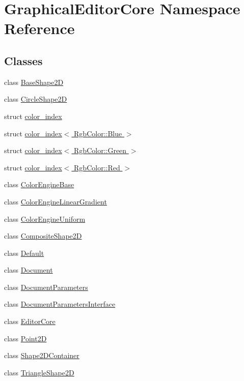 \hypertarget{namespaceGraphicalEditorCore}{}\section{Graphical\+Editor\+Core Namespace Reference}
\label{namespaceGraphicalEditorCore}
\subsection*{Classes}
\begin{DoxyCompactItemize}
\item 
class \hyperlink{classGraphicalEditorCore_1_1BaseShape2D}{Base\+Shape2D}
\item 
class \hyperlink{classGraphicalEditorCore_1_1CircleShape2D}{Circle\+Shape2D}
\item 
struct \hyperlink{structGraphicalEditorCore_1_1color__index}{color\+\_\+index}
\item 
struct \hyperlink{structGraphicalEditorCore_1_1color__index_3_01RgbColor_1_1Blue_01_4}{color\+\_\+index$<$ Rgb\+Color\+::\+Blue $>$}
\item 
struct \hyperlink{structGraphicalEditorCore_1_1color__index_3_01RgbColor_1_1Green_01_4}{color\+\_\+index$<$ Rgb\+Color\+::\+Green $>$}
\item 
struct \hyperlink{structGraphicalEditorCore_1_1color__index_3_01RgbColor_1_1Red_01_4}{color\+\_\+index$<$ Rgb\+Color\+::\+Red $>$}
\item 
class \hyperlink{classGraphicalEditorCore_1_1ColorEngineBase}{Color\+Engine\+Base}
\item 
class \hyperlink{classGraphicalEditorCore_1_1ColorEngineLinearGradient}{Color\+Engine\+Linear\+Gradient}
\item 
class \hyperlink{classGraphicalEditorCore_1_1ColorEngineUniform}{Color\+Engine\+Uniform}
\item 
class \hyperlink{classGraphicalEditorCore_1_1CompositeShape2D}{Composite\+Shape2D}
\item 
class \hyperlink{classGraphicalEditorCore_1_1Default}{Default}
\item 
class \hyperlink{classGraphicalEditorCore_1_1Document}{Document}
\item 
class \hyperlink{classGraphicalEditorCore_1_1DocumentParameters}{Document\+Parameters}
\item 
class \hyperlink{classGraphicalEditorCore_1_1DocumentParametersInterface}{Document\+Parameters\+Interface}
\item 
class \hyperlink{classGraphicalEditorCore_1_1EditorCore}{Editor\+Core}
\item 
class \hyperlink{classGraphicalEditorCore_1_1Point2D}{Point2D}
\item 
class \hyperlink{classGraphicalEditorCore_1_1Shape2DContainer}{Shape2\+D\+Container}
\item 
class \hyperlink{classGraphicalEditorCore_1_1TriangleShape2D}{Triangle\+Shape2D}
\end{DoxyCompactItemize}
